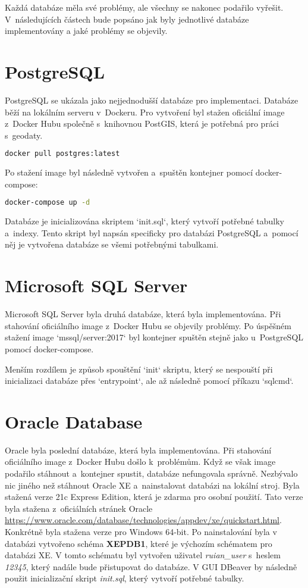 Každá databáze měla své problémy, ale všechny se nakonec podařilo vyřešit.  
V~následujících částech bude popsáno jak byly jednotlivé databáze implementovány a jaké problémy se objevily.

\section{PostgreSQL}
PostgreSQL se ukázala jako nejjednodušší databáze pro implementaci.  
Databáze běží na lokálním serveru v~Dockeru.  
Pro vytvoření byl stažen oficiální image z~Docker Hubu  
společně s~knihovnou PostGIS, která je potřebná pro práci s~geodaty.

\begin{lstlisting}[language=bash]
docker pull postgres:latest
\end{lstlisting}

Po stažení image byl následně vytvořen a~spuštěn kontejner pomocí docker-compose:

\begin{lstlisting}[language=bash]
docker-compose up -d
\end{lstlisting}

Databáze je inicializována skriptem `init.sql`, který vytvoří potřebné tabulky a~indexy.  
Tento skript byl napsán specificky pro databázi PostgreSQL a~pomocí něj je vytvořena databáze  
se všemi potřebnými tabulkami.

\section{Microsoft SQL Server}
Microsoft SQL Server byla druhá databáze, která byla implementována.  
Při stahování oficiálního image z~Docker Hubu se objevily problémy.  
Po úspěšném stažení image `mssql/server:2017` byl kontejner spuštěn stejně jako u~PostgreSQL  
pomocí docker-compose.

Menším rozdílem je způsob spouštění `init` skriptu, který se nespouští při inicializaci databáze  
přes `entrypoint`, ale až následně pomocí příkazu `sqlcmd`.

\newpage

\section{Oracle Database}
Oracle byla poslední databáze, která byla implementována.  
Při stahování oficiálního image z~Docker Hubu došlo k~problémům.  
Když se však image podařilo stáhnout a~kontejner spustit, databáze nefungovala správně.  
Nezbývalo nic jiného než stáhnout Oracle XE a~nainstalovat databázi na lokální stroj.  
Byla stažená verze 21c Express Edition, která je zdarma pro osobní použití.
Tato verze byla stažena z~oficiálních stránek Oracle 
\url{https://www.oracle.com/database/technologies/appdev/xe/quickstart.html}.
Konkrétně byla stažena verze pro Windows 64-bit.
Po nainstalování byla v databázi vytvořeno schéma \textbf{XEPDB1}, které je výchozím 
schématem pro databázi XE. V tomto schématu byl vytvořen uživatel \textit{ruian\_user} s~heslem \textit{12345},
který nadále bude přistupovat do databáze.
V GUI DBeaver by následně použit inicializační skript \textit{init.sql}, 
který vytvoří potřebné tabulky.


